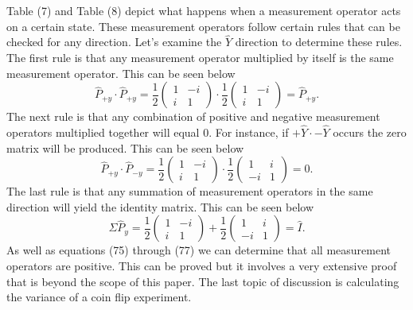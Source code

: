 \documentclass[twocolumn]{article}
\begin{document}
Table (7) and Table (8) depict what happens when a measurement operator acts on a certain state. These measurement operators follow certain rules that can be checked for any direction. Let's examine the $\hat{Y}$ direction to determine these rules. The first rule is that any measurement operator multiplied by itself is the same measurement operator. This can be seen below
\begin{equation}
\hat{P}_{+y}\cdot\hat{P}_{+y}=\frac{1}{2}
\begin{pmatrix}
1 & -i \\
i & 1
\end{pmatrix}
\cdot \frac{1}{2}
\begin{pmatrix}
1 & -i \\
i & 1
\end{pmatrix}
=\hat{P}_{+y}.
\end{equation}
The next rule is that any combination of positive and negative measurement operators multiplied together will equal 0. For instance, if $+\hat{Y}\cdot-\hat{Y}$ occurs the zero matrix will be produced. This can be seen below
\begin{equation}
\hat{P}_{+y}\cdot\hat{P}_{-y}=\frac{1}{2}
\begin{pmatrix}
1 & -i \\
i & 1
\end{pmatrix}
\cdot\frac{1}{2}
\begin{pmatrix}
1 & i \\
-i & 1
\end{pmatrix}
=0.
\end{equation}
The last rule is that any summation of measurement operators in the same direction will yield the identity matrix. This can be seen below
\begin{equation}
\Sigma \hat{P}_y=\frac{1}{2}
\begin{pmatrix}
1 & -i \\
i & 1
\end{pmatrix}
+ \frac{1}{2}
\begin{pmatrix}
1 & i \\
-i & 1
\end{pmatrix}
= \hat{I}.
\end{equation}
As well as equations (75) through (77) we can determine that all measurement operators are positive. This can be proved but it involves a very extensive proof that is beyond the scope of this paper. The last topic of discussion is calculating the variance of a coin flip experiment.
\end{document}
